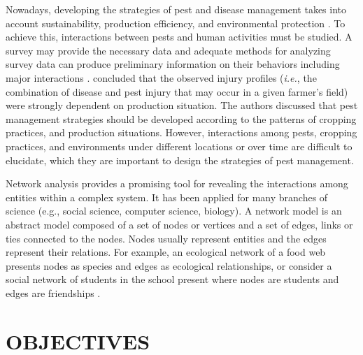 Nowadays, developing the strategies of pest and disease management takes into account sustainability, production efficiency, and environmental protection . To achieve this, interactions between pests and human activities must be studied. A survey may provide the necessary data and adequate methods for analyzing survey data can produce preliminary information on their behaviors including major interactions .  concluded that the observed injury profiles (\textit{i.e.}, the combination of disease and pest injury that may occur in a given farmer’s field) were strongly dependent on production situation.  The authors discussed that pest management strategies should be developed according to the patterns of cropping practices, and production situations. However, interactions among pests, cropping practices, and environments under different locations or over time are difficult to elucidate, which they are important to design the strategies of pest management.

Network analysis provides a promising tool for revealing the interactions among entities within a complex system. It has been applied for many branches of science (e.g., social science, computer science, biology). A network model is an abstract model composed of a set of nodes or vertices and a set of edges, links or ties connected to the nodes. Nodes usually represent entities and the edges represent their relations. For example, an ecological network of a food web presents nodes as species  and edges as ecological relationships, or consider a social network of students in the school present where nodes are students and edges are friendships .

\section*{OBJECTIVES}


